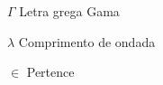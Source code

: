 %
%

\begin{simbolos}
    \item[$ \Gamma $] Letra grega Gama
    \item[$ \lambda $] Comprimento de ondada
    \item[$ \in $] Pertence
\end{simbolos}
